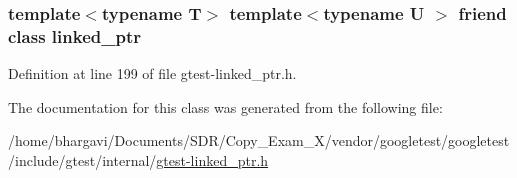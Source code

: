 \subsubsection[{\texorpdfstring{linked\+\_\+ptr}{linked_ptr}}]{\setlength{\rightskip}{0pt plus 5cm}template$<$typename T$>$ template$<$typename U $>$ friend class {\bf linked\+\_\+ptr}\hspace{0.3cm}{\ttfamily [friend]}}\hypertarget{classtesting_1_1internal_1_1linked__ptr_a7763f286ca03a7f7363a033d996c8c1c}{}\label{classtesting_1_1internal_1_1linked__ptr_a7763f286ca03a7f7363a033d996c8c1c}


Definition at line 199 of file gtest-\/linked\+\_\+ptr.\+h.



The documentation for this class was generated from the following file\+:\begin{DoxyCompactItemize}
\item 
/home/bhargavi/\+Documents/\+S\+D\+R/\+Copy\+\_\+\+Exam\+\_\+X/vendor/googletest/googletest/include/gtest/internal/\hyperlink{gtest-linked__ptr_8h}{gtest-\/linked\+\_\+ptr.\+h}\end{DoxyCompactItemize}
